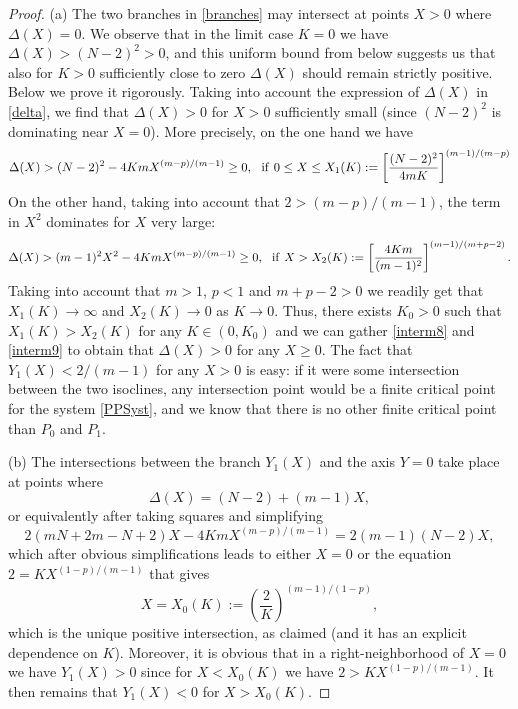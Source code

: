 \documentclass[a4paper,11pt]{article}
\numberwithin{equation}{section}
\begin{document}
\begin{proof}
(a) The two branches in \eqref{branches} may intersect at points $X>0$ where $\Delta(X)=0$. We observe that in the limit case $K=0$ we have $\Delta(X)>(N-2)^2>0$, and this uniform bound from below suggests us that also for $K>0$ sufficiently close to zero $\Delta(X)$ should remain strictly positive. Below we prove it rigorously. Taking into account the expression of $\Delta(X)$ in \eqref{delta}, we find that $\Delta(X)>0$ for $X>0$ sufficiently small (since $(N-2)^2$ is dominating near $X=0$). More precisely, on the one hand we have
\begin{equation}\label{interm8}
\Delta(X)>(N-2)^2-4KmX^{(m-p)/(m-1)}\geq0, \ \ {\rm if} \ 0\leq X\leq X_1(K):=\left[\frac{(N-2)^2}{4mK}\right]^{(m-1)/(m-p)}
\end{equation}
On the other hand, taking into account that $2>(m-p)/(m-1)$, the term in $X^2$ dominates for $X$ very large:
\begin{equation}\label{interm9}
\Delta(X)>(m-1)^2X^2-4KmX^{(m-p)/(m-1)}\geq0, \ \ {\rm if} \ X>X_2(K):=\left[\frac{4Km}{(m-1)^2}\right]^{(m-1)/(m+p-2)}.
\end{equation}
Taking into account that $m>1$, $p<1$ and $m+p-2>0$ we readily get that $X_1(K)\to\infty$ and $X_2(K)\to0$ as $K\to0$. Thus, there exists $K_0>0$ such that $X_1(K)>X_2(K)$ for any $K\in(0,K_0)$ and we can gather \eqref{interm8} and \eqref{interm9} to obtain that $\Delta(X)>0$ for any $X\geq0$. The fact that $Y_1(X)<2/(m-1)$ for any $X>0$ is easy: if it were some intersection between the two isoclines, any intersection point would be a finite critical point for the system \eqref{PPSyst}, and we know that there is no other finite critical point than $P_0$ and $P_1$.

\medskip

(b) The intersections between the branch $Y_1(X)$ and the axis $Y=0$ take place at points where
$$
\Delta(X)=(N-2)+(m-1)X,
$$
or equivalently after taking squares and simplifying
$$
2(mN+2m-N+2)X-4KmX^{(m-p)/(m-1)}=2(m-1)(N-2)X,
$$
which after obvious simplifications leads to either $X=0$ or the equation $2=KX^{(1-p)/(m-1)}$ that gives
\begin{equation}\label{interm10}
X=X_0(K):=\left(\frac{2}{K}\right)^{(m-1)/(1-p)},
\end{equation}
which is the unique positive intersection, as claimed (and it has an explicit dependence on $K$). Moreover, it is obvious that in a right-neighborhood of $X=0$ we have $Y_1(X)>0$ since for $X<X_0(K)$ we have $2>KX^{(1-p)/(m-1)}$. It then remains that $Y_1(X)<0$ for $X>X_0(K)$.


\end{proof}
\end{document}
